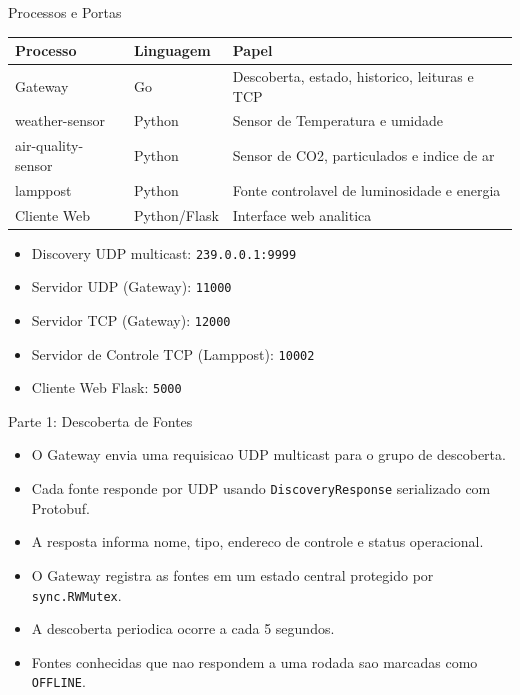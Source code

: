 \documentclass[aspectratio=169]{beamer}
\begin{document}
\begin{frame}{Processos e Portas}
  \small
  \begin{table}
    \centering
    \begin{tabular}{lll}
      \toprule
      Processo & Linguagem & Papel \\
      \midrule
      Gateway & Go & Descoberta, estado, historico, leituras e TCP \\
      weather-sensor & Python & Sensor de Temperatura e umidade \\
      air-quality-sensor & Python & Sensor de CO2, particulados e indice de ar \\
      lamppost & Python & Fonte controlavel de luminosidade e energia\\
      Cliente Web & Python/Flask & Interface web analitica \\
      \bottomrule
    \end{tabular}
  \end{table}

  \vspace{-0.1cm}
  \begin{itemize}
    \item Discovery UDP multicast: \texttt{239.0.0.1:9999}
    \item Servidor UDP (Gateway): \texttt{11000}
    \item Servidor TCP (Gateway): \texttt{12000}
    \item Servidor de Controle TCP (Lamppost): \texttt{10002}
    \item Cliente Web Flask: \texttt{5000}
  \end{itemize}
\end{frame}

\begin{frame}{Parte 1: Descoberta de Fontes}
  \begin{itemize}
    \item O Gateway envia uma requisicao UDP multicast para o grupo de descoberta.
    \item Cada fonte responde por UDP usando \texttt{DiscoveryResponse} serializado com Protobuf.
    \item A resposta informa nome, tipo, endereco de controle e status operacional.
    \item O Gateway registra as fontes em um estado central protegido por \texttt{sync.RWMutex}.
    \item A descoberta periodica ocorre a cada 5 segundos.
    \item Fontes conhecidas que nao respondem a uma rodada sao marcadas como \texttt{OFFLINE}.
  \end{itemize}

\end{frame}
\end{document}
